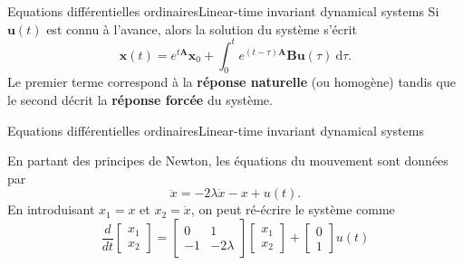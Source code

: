\documentclass[usenames,dvipsnames,svgnames,10pt,aspectratio=169]{beamer}
\begin{document}
\begin{frame}[t, c]{Equations différentielles ordinaires}{Linear-time invariant dynamical systems}
  Si $\bm{u}(t)$ est connu à l'avance, alors la solution du système s'écrit
  \[
  \bm{x}(t) = e^{t \bm{A}} \bm{x}_0 + \int_0^t e^{(t-\tau) \bm{A}} \bm{Bu}(\tau) \ \mathrm{d}\tau.
  \]
  Le premier terme correspond à la \alert{\textbf{réponse naturelle}} (ou homogène) tandis que le second décrit la \alert{\textbf{réponse forcée}} du système.
\end{frame}

\begin{frame}[t, c]{Equations différentielles ordinaires}{Linear-time invariant dynamical systems}
  \begin{minipage}{.48\textwidth}
    En partant des principes de Newton, les équations du mouvement sont données par
    \[
    \ddot{x} = - 2\lambda \dot{x} - x + u(t).
    \]
    En introduisant $x_1 = x$ et $x_2 = \dot{x}$, on peut ré-écrire le système comme
    \[
    \dfrac{d}{dt} \begin{bmatrix} x_1 \\ x_2 \end{bmatrix}
    =
    \begin{bmatrix}
      0 & 1 \\
      -1 & -2\lambda
    \end{bmatrix}
    \begin{bmatrix}
      x_1 \\ x_2
    \end{bmatrix}
    +
    \begin{bmatrix}
      0 \\ 1
    \end{bmatrix}
    u(t)
    \]
  \end{minipage}%
  \hfill
  \begin{minipage}{.48\textwidth}
      \centering
\end{minipage}
\end{frame}
\end{document}
